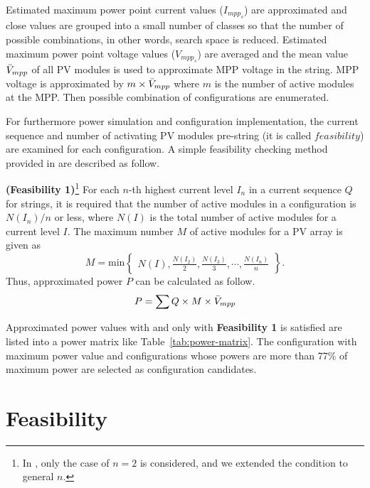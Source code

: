 \documentclass[journal]{IEEEtran}
\begin{document}
Estimated maximum power point current values ($I_{mpp_s}$) are approximated and close values are grouped into a small number of classes so that the number of possible combinations, in other words, search space is reduced.
Estimated maximum power point voltage values ($V_{mpp_s}$) are averaged and the mean value $\Bar{V}_{mpp}$ of all PV modules is used to approximate MPP voltage in the string.
MPP voltage is approximated by $m \times \Bar{V}_{mpp} $ where $m$ is the number of active modules at the MPP.
Then possible combination of configurations are enumerated.

For furthermore power simulation and configuration implementation, the current sequence and number of activating PV modules pre-string (it is called $feasibility$) are examined for each configuration.
A simple feasibility checking method provided in \cite{Orozco-Gutierrez2016} are described as follow.

\textbf{(Feasibility 1)}\footnote{In \cite{Orozco-Gutierrez2016}, only the case of $n=2$ is considered, and we extended the condition to general $n$. }
For each $n$-th highest current level $I_{n}$ in a current sequence $Q$ for strings,
it is required that the number of active modules in a configuration is $N(I_{n}) / n$ or less, where $N(I)$ is the total number of active modules for a current level $I$. 
The maximum number $M$ of active modules for a PV array is given as
\begin{equation}
    M=\mbox{min}\begin{Bmatrix}
N(I),\frac{N(I_2)}{2},\frac{N(I_3)}{3},\cdots,\frac{N(I_{n})}{n}
\end{Bmatrix}.
\label{eq:1}
\end{equation}
Thus, approximated power $P$ can be calculated as follow.
\begin{equation}
\label{eq:2}
P=\sum{Q}\times M \times \Bar{V}_{mpp}
\end{equation}

Approximated power values with and only with \textbf{Feasibility 1} is satisfied are listed into a power matrix like Table~\ref{tab:power-matrix}.
The configuration with  maximum power value and configurations whose powers are more than 77\% of maximum power are selected as configuration candidates\cite{Orozco-Gutierrez2016}.

\section{Feasibility}
\end{document}
